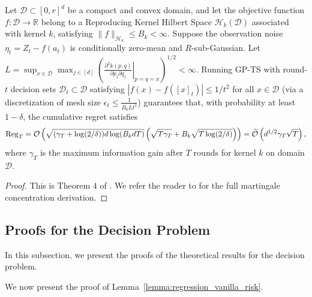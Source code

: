 \begin{theorem}\label{thm:kernel_ts_master}
Let $\mathcal{D} \subset [0, r]^d$ be a compact and convex domain, and let the objective function $f: \mathcal{D} \to \mathbb{R}$ belong to a Reproducing Kernel Hilbert Space $\mathcal{H}_k(\mathcal{D})$ associated with kernel $k$, satisfying $\|f\|_{\mathcal{H}_k} \le B_k < \infty$. Suppose the observation noise $\eta_t = Z_t - f(a_t)$ is conditionally zero-mean and $R$-sub-Gaussian. Let $L = \sup_{x \in \mathcal{D}} \max_{j \in [d]} \left(\left. \frac{\partial^2 k(p,q)}{\partial p_j \partial q_j} \right|_{p=q=x}\right)^{1/2} < \infty$. Running GP-TS with round-$t$ decision sets $\mathcal{D}_t \subset \mathcal{D}$ satisfying $|f(x) - f([x]_t)| \le 1/t^2$ for all $x \in \mathcal{D}$ (via a discretization of mesh size $\epsilon_t \le \frac{1}{B_k L t^2}$) guarantees that, with probability at least $1 - \delta$, the cumulative regret satisfies
\begin{equation*}
    \operatorname{Reg}_T = \mathcal{O}\left( \sqrt{(\gamma_T + \log(2/\delta)) d \log(B_k d T)} \left(\sqrt{T \gamma_T} + B_k \sqrt{T \log(2/\delta)}\right) \right) = \widetilde{\mathcal{O}}\left( d^{1/2} \gamma_T \sqrt{T} \right),
\end{equation*}
where $\gamma_T$ is the maximum information gain after $T$ rounds for kernel $k$ on domain $\mathcal{D}$.
\end{theorem}
\begin{proof}
This is Theorem 4 of \citet{chowdhury2017kernelized}. We refer the reader to \citet{chowdhury2017kernelized} for the full martingale concentration derivation.
\end{proof}



\subsection{Proofs for the Decision Problem}

In this subsection, we present the proofs of the theoretical results for the decision problem.

We now present the proof of Lemma~\ref{lemma:regression_vanilla_risk}.

